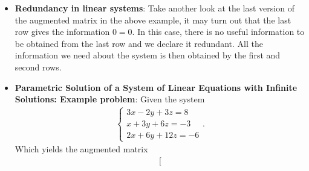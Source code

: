 \documentclass{report}
\begin{document}
\begin{itemize}
\begin{align*}
\begin{array}{ccc|c}
                            1 &2 & 6 & 5 \\
                            -1 & 1 & -2 & 3 \\
                            1 & -4 & -2 & 1
                        \end{array}\right]
                .\end{align*}
                After some row reduction, we get
                \begin{align*}
                    \left[
                        \begin{array}{ccc|c}
                            1 & 2 & 6 & 5 \\
                            0 & 1 & \frac{4}{3} & \frac{8}{3} \\
                            0 & 0 & 0  &12
                        \end{array}
                    \right]
                .\end{align*}
                We notice that this last row implies $0=12$. Thus we assert this row is inconsistent, which implies the entire system is inconsistent, and thus the solution set is 
                \begin{align*}
                    S = \varnothing
                .\end{align*}
        \item \textbf{Redundancy in linear systems}: Take another look at the last version of the augmented matrix in the above example, it may turn out that the last row gives the information $0=0$. In this case, there is no useful information to be obtained from the last row and we declare it redundant. All the information we need about the system is then obtained by the first and second rows.
        \item \textbf{Parametric Solution of a System of Linear Equations with Infinite Solutions: Example problem}:
            \bigbreak \noindent 
            Given the system
            \begin{align*}
               \begin{cases}
                  3x -2y + 3z = 8 \\
                  x + 3y + 6z = -3 \\
                  2x + 6y + 12z = -6
               \end{cases}
            .\end{align*}
            Which yields the augmented matrix
            \begin{align*}
                \left[

\end{align*}
\end{itemize}
\end{document}
